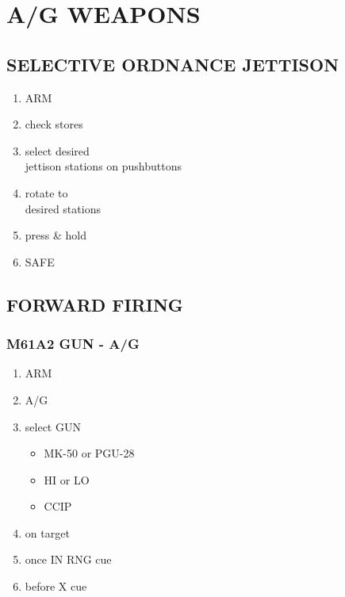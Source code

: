 \documentclass[fontHelvetica, widesubsec]{TechCheck}
\begin{document}
	\cleardoublepage
	\chapter{A/G WEAPONS}
	\minitoc
	\cleardoublepage

	\section{SELECTIVE ORDNANCE JETTISON}
	\begin{enumerate}
		\item {}\dotfill ARM
		\item {}\dotfill check stores
		\item {}\dotfill select desired \\ \hfill jettison stations on pushbuttons
		\item {}\dotfill rotate to \\ \hfill desired stations
		\item {}\dotfill press \& hold
		\item {}\dotfill SAFE
	\end{enumerate}

	\section{FORWARD FIRING}

	\subsection{M61A2 GUN - A/G}
	\begin{enumerate}
		\item {}\dotfill ARM
		\item {}\dotfill A/G
		\item {}\dotfill select GUN
		\begin{itemize}
			\item {} MK-50 or PGU-28
			\item {} HI or LO
			\item {} CCIP
		\end{itemize}
		\item {}\dotfill on target
		\item {}\dotfill once IN RNG cue
		\item {}\dotfill before X cue
	\end{enumerate}
\end{document}
